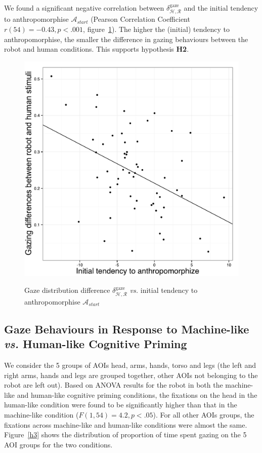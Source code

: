 \documentclass[lettersize, noapacite, twoside, HRI]{apa_HRI}
\newcommand{\vs}{\textit{vs.}\xspace}
\newcommand{\h}[1]{\textbf{H#1}\xspace}
\newcommand{\anti}{{$\mathcal{A}_{start}$\xspace}}
\begin{document}
We found a significant negative correlation between
$\delta_{\mathcal{H},\mathcal{R}}^{\text{gaze}}$ and
the initial tendency to anthropomorphise \anti{} (Pearson Correlation Coefficient $r(54) = -0.43,
p < .001$, figure~\ref{h2}). The higher the (initial) tendency to anthropomorphise, the smaller
the difference in gazing behaviours between the robot and human conditions. This
supports hypothesis \h{2}.

\begin{figure}
    \centering
    \includegraphics[width=0.5\columnwidth]{H2}\label{GazeDifference-vs-ICA}
    \caption{Gaze distribution difference $\delta_{\mathcal{H},
    \mathcal{R}}^{\text{gaze}}$ \vs initial tendency to anthropomorphise \anti{}}
    \label{h2}
\end{figure}

\subsection{Gaze Behaviours in Response to Machine-like \vs Human-like Cognitive Priming}

We consider the 5 groups of AOIs {\sf head}, {\sf arms}, {\sf hands}, {\sf
torso} and {\sf legs} (the left and right arms, hands and legs are grouped
together, other AOIs not belonging to the robot are left out). Based on ANOVA results for the robot in both the machine-like and human-like
cognitive priming conditions, the fixations on the head in the human-like condition
were found to be significantly higher than that in the machine-like condition
($F(1,54) = 4.2, p < .05$). For all other AOIs groups, the fixations across
machine-like and human-like conditions were almost the same. Figure~\ref{h3} shows the
distribution of proportion of time spent gazing on the 5 AOI groups for the two
conditions.
\end{document}
